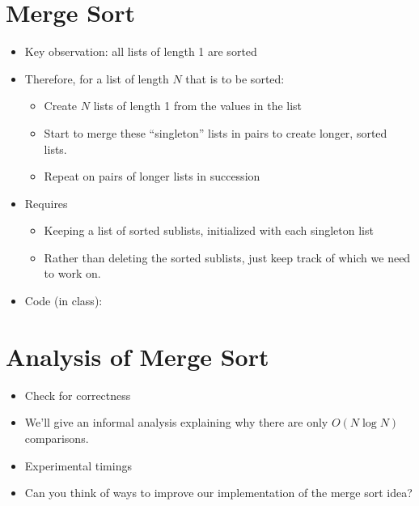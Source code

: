 \documentclass[letterpaper,10pt,english]{sphinxmanual}
\begin{document}
\section{Merge Sort}
\label{\detokenize{lecture_notes/lec21_sorting:merge-sort}}\begin{itemize}
\item {} 
Key observation: all lists of length 1 are sorted

\item {} 
Therefore, for a list of length \(N\) that is to be sorted:
\begin{itemize}
\item {} 
Create \(N\) lists of length 1 from the values in the list

\item {} 
Start to merge these “singleton” lists in pairs to create longer,
sorted lists.

\item {} 
Repeat on pairs of longer lists in succession

\end{itemize}

\item {} 
Requires
\begin{itemize}
\item {} 
Keeping a list of sorted sublists, initialized with each singleton
list

\item {} 
Rather than deleting the sorted sublists, just keep track of which
we need to work on.

\end{itemize}

\item {} 
Code (in class):

%
\begin{sphinxVerbatim}[commandchars=\\\{\}]
 
       
\end{sphinxVerbatim}

\end{itemize}


\section{Analysis of Merge Sort}
\label{\detokenize{lecture_notes/lec21_sorting:analysis-of-merge-sort}}\begin{itemize}
\item {} 
Check for correctness

\item {} 
We’ll give an informal analysis explaining why there are only
\(O(N \log N)\) comparisons.

\item {} 
Experimental timings

\item {} 
Can you think of ways to improve our implementation of the merge sort
idea?

\end{itemize}
\end{document}
